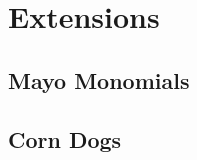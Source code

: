 \chapter{Extensions}
\label{ch-extensions}

\section{Mayo Monomials}
    \label{extensions-advection}
    \lipsum[2]

\section{Corn Dogs}
    \label{extensions-diffusion}
    \lipsum[2]
